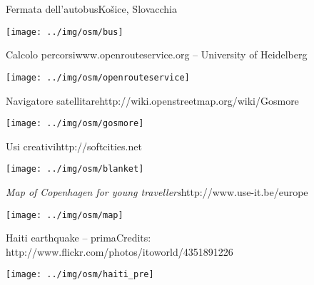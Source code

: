\documentclass[xcolor=svgnames]{beamer}
\begin{document}

	\begin{frame}{Fermata dell'autobus}{Košice, Slovacchia}
		\begin{center}
			\texttt{[image: ../img/osm/bus]}
		\end{center}
	\end{frame}


	\begin{frame}{Calcolo percorsi}{www.openrouteservice.org -- University of Heidelberg}
		\begin{center}
			\texttt{[image: ../img/osm/openrouteservice]}
		\end{center}
	\end{frame}


	\begin{frame}{Navigatore satellitare}{http://wiki.openstreetmap.org/wiki/Gosmore}
		\begin{center}
			\texttt{[image: ../img/osm/gosmore]}
		\end{center}
	\end{frame}


	\begin{frame}{Usi creativi}{http://softcities.net}
		\begin{center}
			\texttt{[image: ../img/osm/blanket]}
		\end{center}
	\end{frame}


	\begin{frame}{\textit{Map of Copenhagen for young travellers}}{http://www.use-it.be/europe}
		\begin{center}
			\texttt{[image: ../img/osm/map]}
		\end{center}
	\end{frame}


	\begin{frame}{Haiti earthquake -- prima}{Credits: http://www.flickr.com/photos/itoworld/4351891226}
		\begin{center}
			\texttt{[image: ../img/osm/haiti\_pre]}
		\end{center}
	\end{frame}
\end{document}
